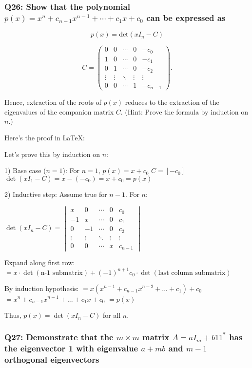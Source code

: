 \documentclass[8pt]{article}
\begin{document}
{\subsubsection*{Q26: Show that the polynomial \( p(x) = x^n + c_{n-1} x^{n-1} + \cdots + c_1 x + c_0 \) can be expressed as}

\[
p(x) = \text{det}(xI_n - C)
\]

\[
C = \begin{pmatrix}
0 & 0 & \cdots & 0 & -c_0 \\
1 & 0 & \cdots & 0 & -c_1 \\
0 & 1 & \cdots & 0 & -c_2 \\
\vdots & \vdots & \ddots & \vdots & \vdots \\
0 & 0 & \cdots & 1 & -c_{n-1}
\end{pmatrix}.
\]

Hence, extraction of the roots of \( p(x) \) reduces to the extraction of the eigenvalues of the companion matrix \( C \). (Hint: Prove the formula by induction on \( n \).)

Here's the proof in LaTeX:

Let's prove this by induction on $n$:

1) Base case ($n = 1$):
   For $n = 1$, $p(x) = x + c_0$
   $C = [-c_0]$
   $\det(xI_1 - C) = x - (-c_0) = x + c_0 = p(x)$

2) Inductive step:
   Assume true for $n-1$. For $n$:
   
   $\det(xI_n - C) = 
   \begin{vmatrix}
   x & 0 & \cdots & 0 & c_0 \\
   -1 & x & \cdots & 0 & c_1 \\
   0 & -1 & \cdots & 0 & c_2 \\
   \vdots & \vdots & \ddots & \vdots & \vdots \\
   0 & 0 & \cdots & x & c_{n-1}
   \end{vmatrix}$

   Expand along first row:
   $= x \cdot \det(\text{n-1 submatrix}) + (-1)^{n+1} c_0 \cdot \det(\text{last column submatrix})$
   
   By induction hypothesis:
   $= x(x^{n-1} + c_{n-1}x^{n-2} + ... + c_1) + c_0$
   $= x^n + c_{n-1}x^{n-1} + ... + c_1x + c_0$
   $= p(x)$

Thus, $p(x) = \det(xI_n - C)$ for all $n$.

\subsubsection*{Q27: Demonstrate that the \(m \times m\) matrix \(A = aI_m + b11^*\) has the eigenvector 1 with eigenvalue \(a + mb\) and \(m - 1\) orthogonal eigenvectors}

}
\end{document}
